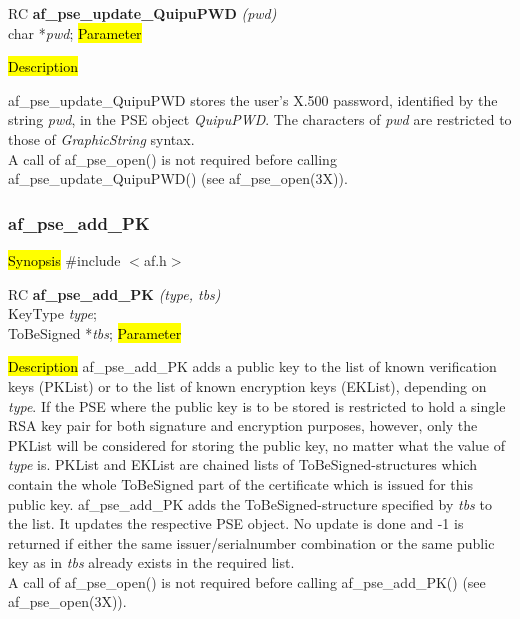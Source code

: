 RC {\bf af\_pse\_update\_QuipuPWD} {\em (pwd)} \\
char *{\em pwd};
\hl{Parameter}

\hl{Description}

af\_pse\_update\_QuipuPWD stores the user's X.500 password, identified by the string {\em pwd}, in the PSE object {\em QuipuPWD}. The characters of {\em pwd} are restricted to those of {\em GraphicString} syntax.  
\\ [1em]
A call of af\_pse\_open() is not required before calling af\_pse\_update\_QuipuPWD()
(see af\_pse\_open(3X)).


\subsubsection{af\_pse\_add\_PK}
\label{af_add_PK}
\hl{Synopsis}
\#include $<$af.h$>$

RC {\bf af\_pse\_add\_PK} {\em (type, tbs)} \\
KeyType {\em type}; \\
ToBeSigned *{\em tbs};
\hl{Parameter}


\hl{Description}
af\_pse\_add\_PK adds a public key to the list of known 
verification keys (PKList) or to the list of known encryption keys (EKList), depending
on {\em type}.
If the PSE where the public key is to be stored is restricted to hold a single RSA key pair
for both signature and encryption purposes, however, only the PKList will be considered for storing the public key,
no matter what the value of {\em type} is.
PKList and EKList are chained lists of ToBeSigned-structures which contain the
whole ToBeSigned part of the certificate which is issued for this public key.
af\_pse\_add\_PK adds the ToBeSigned-structure specified by {\em tbs} to the list.
It updates the respective PSE object. No update is done and -1 is returned if
either the same issuer/serialnumber combination or the same public key as in {\em tbs}
already exists in the required list.
\\ [1em]
A call of af\_pse\_open() is not required before calling af\_pse\_add\_PK()
(see af\_pse\_open(3X)).


